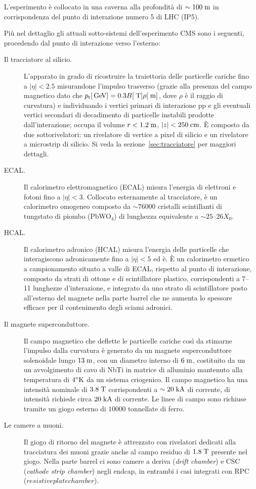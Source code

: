 L’esperimento \`e collocato in una caverna alla profondit\`a di $\sim 100 \rm \; m$ in corrispondenza del punto di interazione numero 5 di LHC (IP5). 

Pi\`u nel dettaglio gli attuali sotto-sistemi dell'esperimento CMS sono i seguenti, procedendo dal punto di interazione verso l'esterno:

\begin{description}
\item[Il tracciatore al silicio.] L'apparato in grado di ricostruire la traiettoria delle particelle cariche fino a $|\eta|<2.5$ misurandone l'impulso trasverso (grazie alla presenza del campo magnetico dato che ${p_{\rm t}} [{\rm \, Ge\kern-0.125em V}] = 0.3 B [\rm \; T] \rho [\rm \; m]$, dove $\rho$ \`e il raggio di curvatura) e individuando i vertici primari di interazione pp e gli eventuali vertici secondari di decadimento di particelle instabili prodotte dall'interazione; occupa il volume $r<1.2\rm \; m$, $|z|<250\rm \; cm$. \`E composto da due sottorivelatori: un rivelatore di vertice a pixel di silicio e un rivelatore a microstrip di silicio. Si veda la sezione~\ref{sec:tracciatore} per maggiori dettagli.
\item[ECAL.] Il calorimetro elettromagnetico (ECAL) misura l’energia di elettroni e fotoni fino a $|\eta|<3$. Collocato esternamente al tracciatore, \`e un calorimetro omogeneo composto da $\sim 76000$ cristalli scintillanti di tungstato di piombo (PbWO$_4$) di lunghezza equivalente a $\sim 25$--$26X_0$.
\item[HCAL.] Il calorimetro adronico (HCAL) misura l'energia delle particelle che interagiscono adronicamente fino a $|\eta|<5$ ed \`e. \`E un calorimetro ermetico a campionamento situato a valle di ECAL, rispetto al punto di interazione, composto da strati di ottone e di scintillatore plastico, corrispondenti a 7--11 lunghezze d'interazione, e integrato da uno strato di scintillatore posto all'esterno del magnete nella parte barrel che ne aumenta lo spessore efficace per il contenimento degli sciami adronici.
\item[Il magnete superconduttore.] Il campo magnetico che deflette le particelle cariche cos\`i da stimarne l’impulso dalla curvatura \`e generato da un magnete superconduttore solenoidale lungo $13\rm \; m$, con un diametro interno di $6\rm \; m$, costituito da un un avvolgimento di cavo di NbTi in matrice di alluminio mantenuto alla temperatura di $4^\circ{\mathrm K}$ da un sistema criogenico. Il campo magnetico ha una intensit\`a nominale di $3.8\rm \; T$ corrispondenti a $\sim 20\rm \; kA$ di corrente,  di intensit\`a richiede circa $20\rm \; kA$ di corrente. Le linee di campo sono richiuse tramite un giogo esterno di $10000$ tonnellate di ferro.
\item[Le camere a muoni.] Il giogo di ritorno del magnete \`e attrezzato con rivelatori dedicati alla tracciatura dei muoni grazie anche al campo residuo di $1.8\rm \; T$ presente nel giogo. Nella parte barrel ci sono camere a deriva ({\em drift chamber}) e CSC ({\em cathode strip chamber}) negli endcap, in entrambi i casi integrati con RPC ($resistive plate chamber$).  
\end{description}

